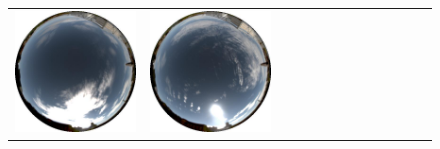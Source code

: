 \documentclass{report}
\begin{document}
\begin{figure}[!th]
\begin{tabular}{@{}rcccccccccccc@{}}
    \includegraphics[width=\customwidth]{./figures/database/20131106_125937.jpg} &
    \includegraphics[width=\customwidth]{./figures/database/20131106_132936.jpg} &

\end{tabular}
\end{figure}
\end{document}
